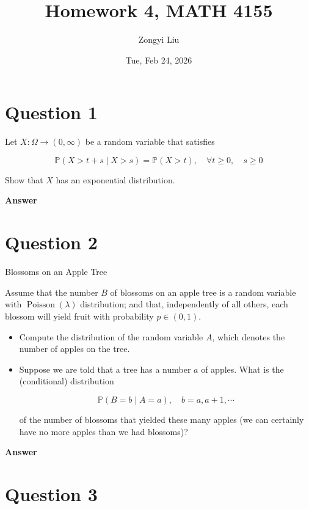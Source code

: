\documentclass[letterpaper]{article}
\title{Homework 4, MATH 4155}
\author{Zongyi Liu}
\date{Tue, Feb 24, 2026}
\begin{document}
		\maketitle
		\section{Question 1}
		
		Let $X: \Omega \rightarrow(0, \infty)$ be a random variable that satisfies
		
		$$
		\mathbb{P}(X>t+s \mid X>s)=\mathbb{P}(X>t), \quad \forall t \geq 0, \quad s \geq 0
		$$
		
		Show that $X$ has an exponential distribution.
		
		\textbf{Answer}
		
		\clearpage
		
		\section{Question 2}
		
		{\color{deepred} Blossoms on an Apple Tree}
		
		Assume that the number $B$ of blossoms on an apple tree is a random variable with $\operatorname{Poisson}(\lambda)$ distribution; and that, independently of all others, each blossom will yield fruit with probability $p \in(0,1)$.
		\begin{itemize}
			\item[(i)] Compute the distribution of the random variable $A$, which denotes the number of apples on the tree.
			
			\item[(ii)] Suppose we are told that a tree has a number $a$ of apples. What is the (conditional) distribution

		
		$$
		\mathbb{P}(B=b \mid A=a), \quad b=a, a+1, \cdots
		$$
		
		of the number of blossoms that yielded these many apples (we can certainly have no more apples than we had blossoms)? 
				\end{itemize}
		
		
		\textbf{Answer}
		
		\clearpage
		
		\section{Question 3}
		
\end{document}
